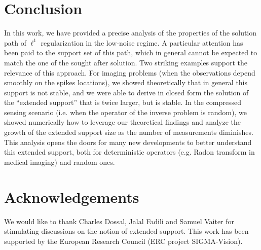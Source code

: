 
\section*{Conclusion}

In this work, we have provided a precise analysis of the properties of the solution path of $\ell^1$ regularization  in the low-noise regime. 
A particular attention has been paid to the support set of this path, which in general cannot be expected to match the one of the sought after solution. Two striking examples support the relevance of this approach. For imaging problems (when the observations depend smoothly on the spikes locations), we showed theoretically that in general this support is not stable, and we were able to derive in closed form the solution of the ``extended support'' that is twice larger, but is stable. 
In the compressed sensing scenario (i.e. when the operator of the inverse problem is random), we showed numerically how to leverage our theoretical findings and analyze the growth of the extended support size as the number of measurements diminishes. This analysis opens the doors for many new developments to better understand this extended support, both for deterministic operators (e.g. Radon transform in medical imaging) and random ones.  

% 

\section*{Acknowledgements} 

We would like to thank Charles Dossal, Jalal Fadili and Samuel Vaiter for stimulating discussions on the notion of extended support. This work has been supported by the European Research Council (ERC project SIGMA-Vision).
